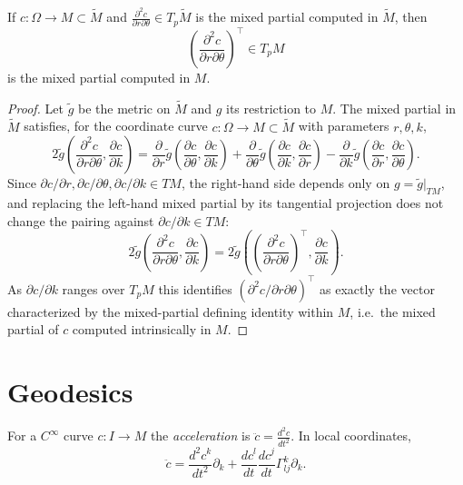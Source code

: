 \begin{proposition}
  \label{prop:pet-ch5-mixed-partials-submanifold}
  If $c:\Omega\to M\subset\tilde M$ and $\frac{\partial^2c}{\partial r\partial\theta}\in T_p\tilde M$
  is the mixed partial computed in $\tilde M$, then
  \[
    \left(\frac{\partial^2c}{\partial r\partial\theta}\right)^\top\in T_pM
  \]
  is the mixed partial computed in $M$.
\end{proposition}
\begin{proof}
  Let $\tilde g$ be the metric on $\tilde M$ and $g$ its restriction to $M$. The
  mixed partial in $\tilde M$ satisfies, for the coordinate curve
  $c:\Omega\to M\subset\tilde M$ with parameters $r,\theta,k$,
  \[
    2\tilde g\!\left(\frac{\partial^2c}{\partial r\partial\theta},\frac{\partial c}{\partial k}\right)
    =\frac{\partial}{\partial r}\tilde g\!\left(\frac{\partial c}{\partial\theta},\frac{\partial c}{\partial k}\right)
    +\frac{\partial}{\partial\theta}\tilde g\!\left(\frac{\partial c}{\partial k},\frac{\partial c}{\partial r}\right)
    -\frac{\partial}{\partial k}\tilde g\!\left(\frac{\partial c}{\partial r},\frac{\partial c}{\partial\theta}\right).
  \]
  Since $\partial c/\partial r,\partial c/\partial\theta,\partial c/\partial k\in TM$, the right-hand side
  depends only on $g=\tilde g|_{TM}$, and replacing the left-hand mixed partial by
  its tangential projection does not change the pairing against $\partial c/\partial k\in TM$:
  \[
    2\tilde g\!\left(\frac{\partial^2c}{\partial r\partial\theta},\frac{\partial c}{\partial k}\right)
    =2\tilde g\!\left(\left(\frac{\partial^2c}{\partial r\partial\theta}\right)^{\!\top},\frac{\partial c}{\partial k}\right).
  \]
  As $\partial c/\partial k$ ranges over $T_pM$ this identifies
  $(\partial^2c/\partial r\partial\theta)^\top$ as exactly the vector characterized by the
  mixed-partial defining identity within $M$, i.e.\ the mixed partial of $c$ computed
  intrinsically in $M$.
\end{proof}

\section{Geodesics}

\begin{definition}
  \label{def:pet-ch5-acceleration}
  \leanok
  For a $C^\infty$ curve $c:I\to M$ the \emph{acceleration} is $\ddot c=\frac{d^2c}{dt^2}$.
  In local coordinates,
  \[
    \ddot c=\frac{d^2c^k}{dt^2}\partial_k+\frac{dc^l}{dt}\frac{dc^j}{dt}\Gamma^k_{lj}\partial_k.
  \]
\end{definition}

